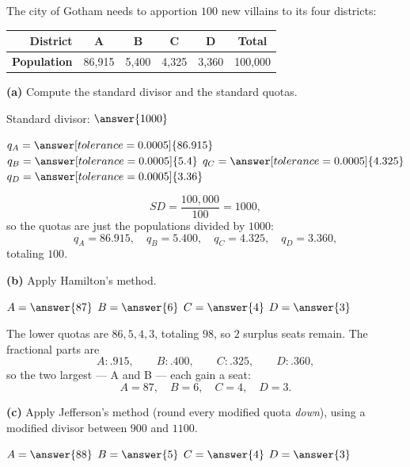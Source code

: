 \documentclass[12pt]{ximera}
\begin{document}
\begin{problem}
The city of Gotham needs to apportion $100$ new villains to its four districts:

\begin{center}
\begin{tabular}{|r|c|c|c|c|c|}\hline
\textbf{District} & A & B & C & D & \textbf{Total} \\\hline
\textbf{Population} & 86{,}915 & 5{,}400 & 4{,}325 & 3{,}360 & 100{,}000 \\\hline
\end{tabular}
\end{center}

\begin{prompt}
\textbf{(a)} Compute the standard divisor and the standard quotas.

Standard divisor: $\answer{1000}$

\smallskip
$q_A = \answer[tolerance=0.0005]{86.915}$ \quad
$q_B = \answer[tolerance=0.0005]{5.4}$ \quad
$q_C = \answer[tolerance=0.0005]{4.325}$ \quad
$q_D = \answer[tolerance=0.0005]{3.36}$

\begin{feedback}
\[ SD = \frac{100{,}000}{100} = 1000, \]
so the quotas are just the populations divided by $1000$:
\[ q_A = 86.915, \quad q_B = 5.400, \quad q_C = 4.325, \quad q_D = 3.360, \]
totaling $100$. \checkmark
\end{feedback}
\end{prompt}

\begin{prompt}
\textbf{(b)} Apply Hamilton's method.

$A = \answer{87}$ \quad $B = \answer{6}$ \quad $C = \answer{4}$ \quad $D = \answer{3}$

\begin{feedback}
The lower quotas are $86, 5, 4, 3$, totaling $98$, so $2$ surplus seats remain.
The fractional parts are
\[ A: .915, \qquad B: .400, \qquad C: .325, \qquad D: .360, \]
so the two largest --- A and B --- each gain a seat:
\[ A = 87, \quad B = 6, \quad C = 4, \quad D = 3. \]
\end{feedback}
\end{prompt}

\begin{prompt}
\textbf{(c)} Apply Jefferson's method (round every modified quota \emph{down}), using a
modified divisor between $900$ and $1100$.

$A = \answer{88}$ \quad $B = \answer{5}$ \quad $C = \answer{4}$ \quad $D = \answer{3}$


\end{prompt}
\end{problem}
\end{document}
